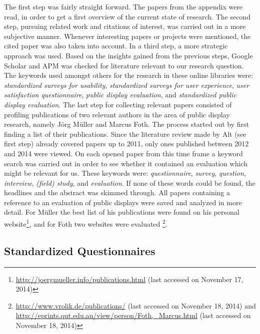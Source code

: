 	The first step was fairly straight forward. The papers from the appendix were read, in order to get a first overview of the current state of research. 
	The second step, pursuing related work and citations of interest, was carried out in a more subjective manner. Whenever interesting papers or projects were mentioned, the cited paper was also taken into account. 
	In a third step, a more strategic approach was used. Based on the insights gained from the previous steps, Google Scholar and APM was checked for literature relevant to our research question. The keywords used amongst others for the research in these online libraries were: \textit{standardized surveys for usability}, \textit{standardized surveys for user experience}, \textit{user satisfaction questionnaire}, \textit{public display evaluation}, and \textit{standardized public display evaluation}.
	The last step for collecting relevant papers consisted of profiling publications of two relevant authors in the area of public display research, namely J\"org M\"uller and Marcus Foth. The process started out by first finding a list of their publications. Since the literature review made by Alt (see first step) already covered papers up to 2011, only ones published between 2012 and 2014 were viewed. 
	On each opened paper from this time frame a keyword search was carried out in order to see whether it contained an evaluation which might be relevant for us. These keywords were: \textit{questionnaire}, \textit{survey}, \textit{question}, \textit{interview}, \textit{(field) study}, and \textit{evaluation}. If none of these words could be found, the headlines and the abstract was skimmed through. All papers containing a reference to an evaluation of public displays were saved and analyzed in more detail.
	For M\"uller the best list of his publications were found on his personal website\footnote{\url{http://joergmueller.info/publications.html} (last accessed on November 17, 2014)}, and for Foth two websites were evaluated \footnote{\url{http://www.vrolik.de/publications/} (last accessed on November 18, 2014) and \url{http://eprints.qut.edu.au/view/person/Foth,_Marcus.html} (last accessed on November 18, 2014)}. 





\clearpage

\subsection{Standardized Questionnaires}
\label{section:questionnaires:categorization}

